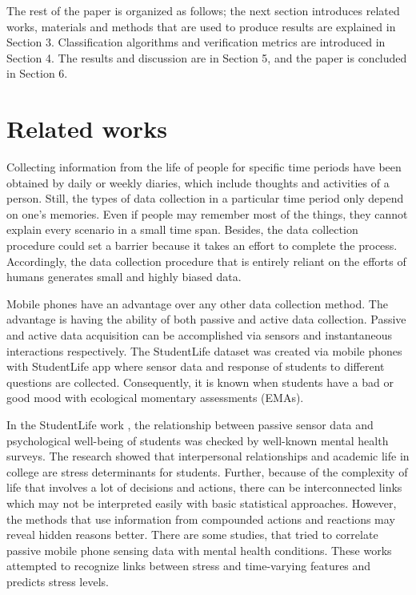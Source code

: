 \documentclass[3p,times,procedia]{elsarticle}
\begin{document}
The rest of the paper is organized as follows; the next section introduces related works, materials and methods that are used to produce results are explained in Section 3. Classification algorithms and verification metrics are introduced in Section 4. The results and discussion are in Section 5, and the paper is concluded in Section 6.


\section{Related works}
\label{related-works}
Collecting information from the life of people for specific time periods have been obtained by daily or weekly diaries, which include thoughts and activities of a person. Still, the types of data collection in a particular time period only depend on one's memories. Even if people may remember most of the things, they cannot explain every scenario in a small time span. Besides, the data collection procedure could set a barrier because it takes an effort to complete the process. Accordingly, the data collection procedure that is entirely reliant on the efforts of humans generates small and highly biased data. 

Mobile phones have an advantage over any other data collection method. The advantage is having the ability of both passive and active data collection. Passive and active data acquisition can be accomplished via sensors and instantaneous interactions respectively. The StudentLife dataset \cite{Wang2014} was created via mobile phones with StudentLife app where sensor data and response of students to different questions are collected. Consequently, it is known when students have a bad or good mood with ecological momentary assessments (EMAs). 

In the StudentLife work \cite{Wang2014}, the relationship between passive sensor data and psychological well-being of students was checked by well-known mental health surveys. The research showed that interpersonal relationships and academic life in college are stress determinants for students. Further, because of the complexity of life that involves a lot of decisions and actions, there can be interconnected links which may not be interpreted easily with basic statistical approaches. However, the methods that use information from compounded actions and reactions may reveal hidden reasons better. There are some studies, \cite{BenZeev2015, Becker2016, Pratap2019, Saeb2016} that tried to correlate passive mobile phone sensing data with mental health conditions. These works attempted to recognize links between stress and time-varying features and predicts stress levels. 
\end{document}
